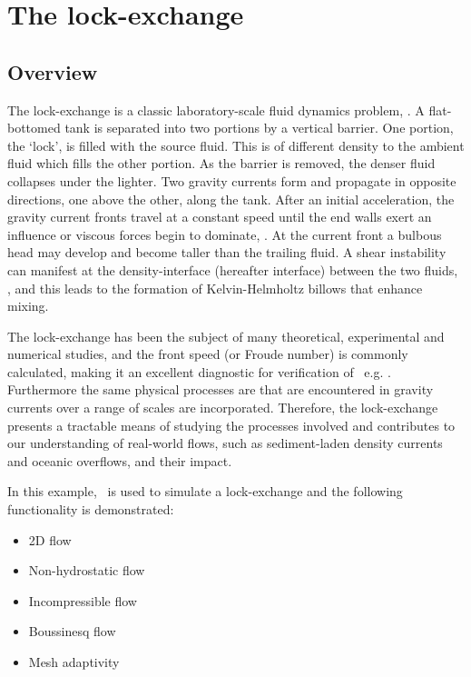 \section{The lock-exchange}
\label{sect:lock_exchange}
\subsection{Overview}
\label{sect:lock_exchange_overview}

The lock-exchange is a classic laboratory-scale fluid dynamics problem, \citep{fannelop_94, huppert_06, simpson_87}. A flat-bottomed tank is separated into two portions by a vertical barrier. One portion, the `lock', is filled with the source fluid. This is of different density to the ambient fluid which fills the other portion. As the barrier is removed, the denser fluid collapses under the lighter. Two gravity currents form and propagate in opposite directions, one above the other, along the tank. After an initial acceleration, the gravity current fronts travel at a constant speed until the end walls exert an influence or viscous forces begin to dominate, \citep{cantero_07, hartel_99, huppert_80}. At the current front a bulbous head may develop and become taller than the trailing fluid. A shear instability can manifest at the density-interface (hereafter interface) between the two fluids, \citep{turner_73}, and this leads to the formation of Kelvin-Helmholtz billows that enhance mixing.

The lock-exchange has been the subject of many theoretical, experimental and numerical studies, and the front speed (or Froude number) is commonly calculated, making it an excellent diagnostic for verification of \fluidity\, e.g. \citep{benjamin_68, klemp_94, hartel_00}. Furthermore the same physical processes are that are encountered in gravity currents over a range of scales are incorporated. Therefore, the lock-exchange presents a tractable means of studying the processes involved and contributes to our understanding of real-world flows, such as sediment-laden density currents and oceanic overflows, and their impact.

In this example, \fluidity\ is used to simulate a lock-exchange and the following functionality is demonstrated:

\begin{itemize}
\item 2D flow
\item Non-hydrostatic flow
\item Incompressible flow
\item Boussinesq flow
\item Mesh adaptivity

\end{itemize}

